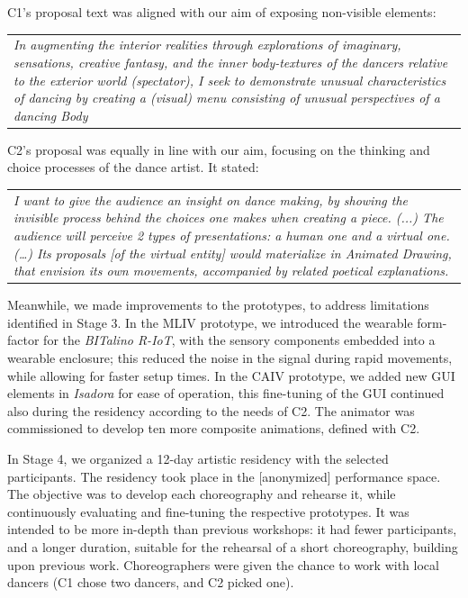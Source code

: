 C1’s proposal text was aligned with our aim of exposing non-visible elements:

\begin{center}
\begin{tabular}{ p{13cm}}
    \textit{In augmenting the interior realities through explorations of imaginary, sensations, creative fantasy, and the inner body-textures of the dancers relative to the exterior world (spectator), I seek to demonstrate unusual characteristics of dancing by creating a (visual) menu consisting of unusual perspectives of a dancing Body}
\end{tabular}
\end{center}

C2’s proposal was equally in line with our aim, focusing on the thinking and choice processes of the dance artist. It stated:

\begin{center} 
\begin{tabular}{ p{13cm}}
    \textit{I want to give the audience an insight on dance making, by showing the invisible process behind the choices one makes when creating a piece. (...) The audience will perceive 2 types of presentations: a human one and a virtual one. (…) Its proposals [of the virtual entity] would materialize in Animated Drawing, that envision its own movements, accompanied by related poetical explanations.}
\end{tabular}
\end{center}

Meanwhile, we made improvements to the prototypes, to address limitations identified in Stage 3. In the MLIV prototype, we introduced the wearable form-factor for the \textit{BITalino R-IoT}, with the sensory components embedded into a wearable enclosure; this reduced the noise in the signal during rapid movements, while allowing for faster setup times. In the CAIV prototype, we added new GUI elements in \textit{Isadora} for ease of operation, this fine-tuning of the GUI continued also during the residency according to the needs of C2. The animator was commissioned to develop ten more composite animations, defined with C2.

In Stage 4, we organized a 12-day artistic residency with the selected participants. The residency took place in the [anonymized] performance space. The objective was to develop each choreography and rehearse it, while continuously evaluating and fine-tuning the respective prototypes. It was intended to be more in-depth than previous workshops: it had fewer participants, and a longer duration, suitable for the rehearsal of a short choreography, building upon previous work. Choreographers were given the chance to work with local dancers (C1 chose two dancers, and C2 picked one). 


